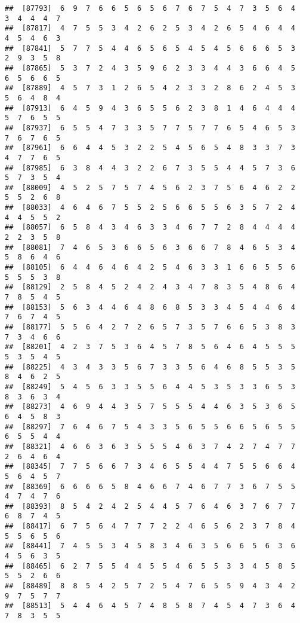 \documentclass[
]{book}
\begin{document}
\begin{verbatim}
##  [87793]  6  9  7  6  6  5  6  5  6  7  6  7  5  4  7  3  5  6  4  3  4  4  4  7
##  [87817]  4  7  5  5  3  4  2  6  2  5  3  4  2  6  5  4  6  4  4  4  5  4  6  3
##  [87841]  5  7  7  5  4  4  6  5  6  5  4  5  4  5  6  6  6  5  3  2  9  3  5  8
##  [87865]  5  3  7  2  4  3  5  9  6  2  3  3  4  4  3  6  6  4  5  6  5  6  6  5
##  [87889]  4  5  7  3  1  2  6  5  4  2  3  3  2  8  6  2  4  5  3  5  6  4  8  4
##  [87913]  6  4  5  9  4  3  6  5  5  6  2  3  8  1  4  6  4  4  4  5  7  6  5  5
##  [87937]  6  5  5  4  7  3  3  5  7  7  5  7  7  6  5  4  6  5  3  7  6  7  6  5
##  [87961]  6  6  4  4  5  3  2  2  5  4  5  6  5  4  8  3  3  7  3  4  7  7  6  5
##  [87985]  6  3  8  4  4  3  2  2  6  7  3  5  5  4  4  5  7  3  6  5  7  3  5  4
##  [88009]  4  5  2  5  7  5  7  4  5  6  2  3  7  5  6  4  6  2  2  5  5  2  6  8
##  [88033]  4  6  4  6  7  5  5  2  5  6  6  5  5  6  3  5  7  2  4  4  4  5  5  2
##  [88057]  6  5  8  4  3  4  6  3  3  4  6  7  7  2  8  4  4  4  4  2  2  3  5  8
##  [88081]  7  4  6  5  3  6  6  5  6  3  6  6  7  8  4  6  5  3  4  5  8  6  4  6
##  [88105]  6  4  4  6  4  6  4  2  5  4  6  3  3  1  6  6  5  5  6  5  5  5  3  8
##  [88129]  2  5  8  4  5  2  4  2  4  3  4  7  8  3  5  4  8  6  4  7  8  5  4  5
##  [88153]  5  6  3  4  4  6  4  8  6  8  5  3  3  4  5  4  4  6  4  7  6  7  4  5
##  [88177]  5  5  6  4  2  7  2  6  5  7  3  5  7  6  6  5  3  8  3  7  3  4  6  6
##  [88201]  4  2  3  7  5  3  6  4  5  7  8  5  6  4  6  4  5  5  5  5  3  5  4  5
##  [88225]  4  3  4  3  3  5  6  7  3  3  5  6  4  6  8  5  5  3  5  8  4  6  2  5
##  [88249]  5  4  5  6  3  3  5  5  6  4  4  5  3  5  3  3  6  5  3  8  3  6  3  4
##  [88273]  4  6  9  4  4  3  5  7  5  5  5  4  4  6  3  5  3  6  5  6  4  5  8  3
##  [88297]  7  6  4  6  7  5  4  3  3  5  6  5  5  6  6  5  6  5  5  6  5  5  4  4
##  [88321]  4  6  6  3  6  3  5  5  5  4  6  3  7  4  2  7  4  7  7  2  6  4  6  4
##  [88345]  7  7  5  6  6  7  3  4  6  5  5  4  4  7  5  5  6  6  4  5  6  4  5  7
##  [88369]  6  6  6  6  5  8  4  6  6  7  4  6  7  7  3  6  7  5  5  4  7  4  7  6
##  [88393]  8  5  4  2  4  2  5  4  4  5  7  6  4  6  3  7  6  7  7  6  8  7  4  5
##  [88417]  6  7  5  6  4  7  7  7  2  2  4  6  5  6  2  3  7  8  4  5  5  6  5  6
##  [88441]  7  4  5  5  3  4  5  8  3  4  6  3  5  6  6  5  6  3  6  4  5  6  3  5
##  [88465]  6  2  7  5  5  4  4  5  5  4  6  5  5  3  3  4  5  8  5  5  5  2  6  6
##  [88489]  8  8  5  4  2  5  7  2  5  4  7  6  5  5  9  4  3  4  2  9  7  5  7  7
##  [88513]  5  4  4  6  4  5  7  4  8  5  8  7  4  5  4  7  3  6  4  7  8  3  5  5

\end{verbatim}
\end{document}
